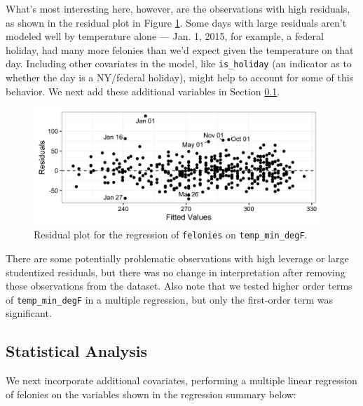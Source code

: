 \documentclass[11pt,notitlepage]{article}
\begin{document}
What's most interesting here, however, are the observations with high residuals, as shown in the residual plot in Figure \ref{fig:lm1Residuals}. Some days with large residuals aren't modeled well by temperature alone --- Jan. 1, 2015, for example, a federal holiday, had many more felonies than we'd expect given the temperature on that day. Including other covariates in the model, like \texttt{is_holiday} (an indicator as to whether the day is a NY/federal holiday), might help to account for some of this behavior. We next add these additional variables in Section \ref{sec:modelFeloniesMultipleRegression}.

\begin{figure}[!h]
	\centering
	\captionsetup{width=0.8\textwidth}
	\includegraphics[width=4.25in]{figures/lm1Residuals.png}
	\caption{Residual plot for the regression of \texttt{felonies} on \texttt{temp_min_degF}.}
	\label{fig:lm1Residuals}
\end{figure}


There are some potentially problematic observations with high leverage or large studentized residuals, but there was no change in interpretation after removing these observations from the dataset. Also note that we tested higher order terms of \texttt{temp_min_degF} in a multiple regression, but only the first-order term was significant.


\subsection{Statistical Analysis}
\label{sec:modelFeloniesMultipleRegression}

We next incorporate additional covariates, performing a multiple linear regression of felonies on the variables shown in the regression summary below:
\end{document}

